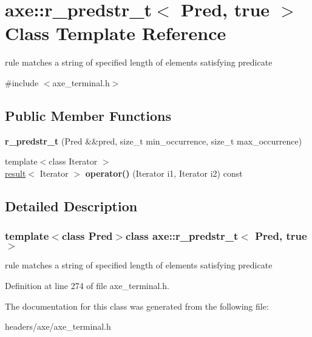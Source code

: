 \hypertarget{classaxe_1_1r__predstr__t_3_01Pred_00_01true_01_4}{\section{axe\+:\+:r\+\_\+predstr\+\_\+t$<$ Pred, true $>$ Class Template Reference}
\label{classaxe_1_1r__predstr__t_3_01Pred_00_01true_01_4}
}


rule matches a string of specified length of elements satisfying predicate  




{\ttfamily \#include $<$axe\+\_\+terminal.\+h$>$}

\subsection*{Public Member Functions}
\begin{DoxyCompactItemize}
\item 
\hypertarget{classaxe_1_1r__predstr__t_3_01Pred_00_01true_01_4_a966f3602f252a3b30a9db558e293077d}{{\bfseries r\+\_\+predstr\+\_\+t} (Pred \&\&pred, size\+\_\+t min\+\_\+occurrence, size\+\_\+t max\+\_\+occurrence)}\label{classaxe_1_1r__predstr__t_3_01Pred_00_01true_01_4_a966f3602f252a3b30a9db558e293077d}

\item 
\hypertarget{classaxe_1_1r__predstr__t_3_01Pred_00_01true_01_4_a2edba39dbfbae93b06ad6c4f385d14b3}{{\footnotesize template$<$class Iterator $>$ }\\\hyperlink{structaxe_1_1result}{result}$<$ Iterator $>$ {\bfseries operator()} (Iterator i1, Iterator i2) const }\label{classaxe_1_1r__predstr__t_3_01Pred_00_01true_01_4_a2edba39dbfbae93b06ad6c4f385d14b3}

\end{DoxyCompactItemize}


\subsection{Detailed Description}
\subsubsection*{template$<$class Pred$>$class axe\+::r\+\_\+predstr\+\_\+t$<$ Pred, true $>$}

rule matches a string of specified length of elements satisfying predicate 

Definition at line 274 of file axe\+\_\+terminal.\+h.



The documentation for this class was generated from the following file\+:\begin{DoxyCompactItemize}
\item 
headers/axe/axe\+\_\+terminal.\+h\end{DoxyCompactItemize}
